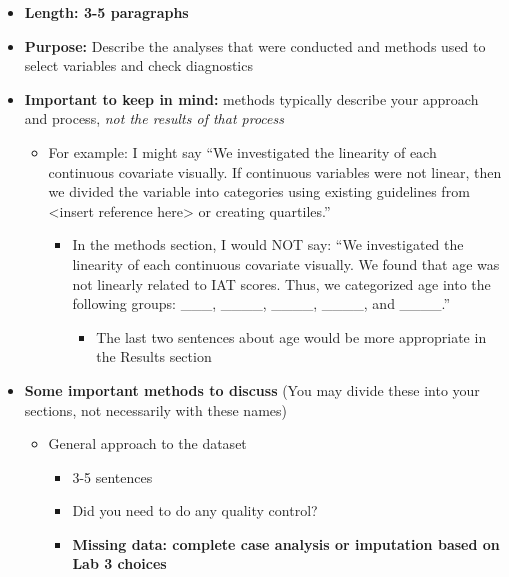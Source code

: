 \documentclass[
  letterpaper,
  DIV=11,
  numbers=noendperiod]{scrartcl}
\providecommand{\tightlist}{%
  \setlength{\itemsep}{0pt}\setlength{\parskip}{0pt}}\usepackage{longtable,booktabs,array}
\begin{document}
\begin{itemize}
\tightlist
\item
  \textbf{Length: 3-5 paragraphs}
\item
  \textbf{Purpose:} Describe the analyses that were conducted and
  methods used to select variables and check diagnostics
\item
  \textbf{Important to keep in mind:} methods typically describe your
  approach and process, \emph{not the results of that process}

  \begin{itemize}
  \tightlist
  \item
    For example: I might say ``We investigated the linearity of each
    continuous covariate visually. If continuous variables were not
    linear, then we divided the variable into categories using existing
    guidelines from \textless insert reference here\textgreater{} or
    creating quartiles.''

    \begin{itemize}
    \tightlist
    \item
      In the methods section, I would NOT say: ``We investigated the
      linearity of each continuous covariate visually. We found that age
      was not linearly related to IAT scores. Thus, we categorized age
      into the following groups: \_\_\_, \_\_\_\_, \_\_\_\_, \_\_\_\_,
      and \_\_\_\_.''

      \begin{itemize}
      \tightlist
      \item
        The last two sentences about age would be more appropriate in
        the Results section
      \end{itemize}
    \end{itemize}
  \end{itemize}
\item
  \textbf{Some important methods to discuss} (You may divide these into
  your sections, not necessarily with these names)

  \begin{itemize}
  \tightlist
  \item
    General approach to the dataset

    \begin{itemize}
    \tightlist
    \item
      3-5 sentences
    \item
      Did you need to do any quality control?
    \item
      {\textbf{Missing data: complete case analysis or imputation based
      on Lab 3 choices}}


\end{itemize}
\end{itemize}
\end{itemize}
\end{document}
